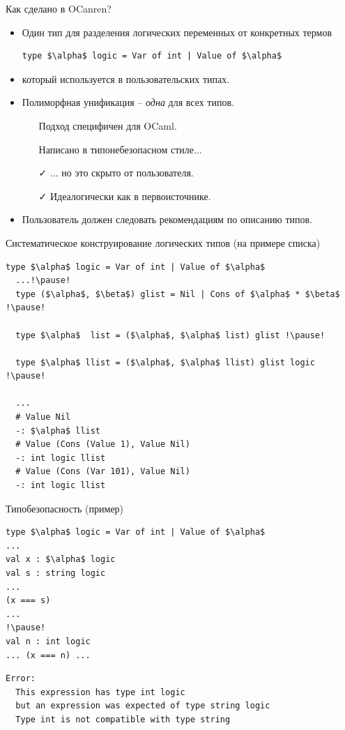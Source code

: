 \documentclass[10pt, mathserif]{beamer}
\theoremstyle{definition}
\begin{document}
\begin{frame}[fragile]{Как сделано в OCanren?}

\begin{itemize}
 \item Один тип для разделения логических переменных от конкретных термов
    \begin{lstlisting}[mathescape=true]
      type $\alpha$ logic = Var of int | Value of $\alpha$
    \end{lstlisting}
 \item который используется в пользовательских типах.

 \pause
 \item Полиморфная унификация -- \emph{одна} для всех типов.
    \vspace{1em}
    \begin{itemize}
    \item[\faTimes] Подход специфичен для OCaml.
    \item[\faTimes] Написано в типонебезопасном стиле...
    \item[\faCheck] ... но это скрыто от пользователя.
    \item[\faCheck] Идеалогически как в первоисточнике.
    \end{itemize}
  \pause
  \item Пользователь должен следовать рекомендациям по описанию типов.
\end{itemize}
\end{frame}

\begin{frame}[fragile]{Систематическое конструирование логических типов (на примере списка)}
  \begin{lstlisting}[mathescape=true]
  type $\alpha$ logic = Var of int | Value of $\alpha$
  ...!\pause!
  type ($\alpha$, $\beta$) glist = Nil | Cons of $\alpha$ * $\beta$ !\pause!

  type $\alpha$  list = ($\alpha$, $\alpha$ list) glist !\pause!

  type $\alpha$ llist = ($\alpha$, $\alpha$ llist) glist logic !\pause!

  ...
  # Value Nil
  -: $\alpha$ llist
  # Value (Cons (Value 1), Value Nil)
  -: int logic llist
  # Value (Cons (Var 101), Value Nil)
  -: int logic llist
  \end{lstlisting}
\end{frame}


\begin{frame}[fragile]{Типобезопасность (пример)}
\begin{lstlisting}[mathescape=true]
type $\alpha$ logic = Var of int | Value of $\alpha$
...
val x : $\alpha$ logic
val s : string logic
...
(x === s)
...
!\pause!
val n : int logic
... (x === n) ...
\end{lstlisting}
\begin{verbatim}
Error: 
  This expression has type int logic
  but an expression was expected of type string logic
  Type int is not compatible with type string
\end{verbatim}

\end{frame}
\end{document}
